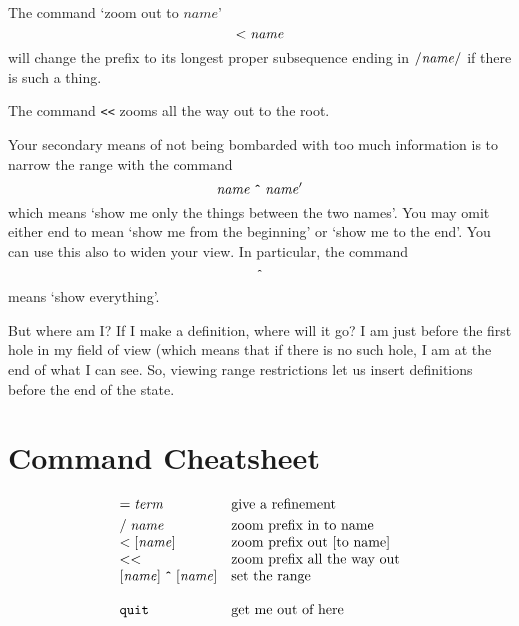 \documentclass{article}
\newcommand*\cleartoleftpage{%
  \clearpage
  \ifodd\value{page}\hbox{}\newpage\fi
}
\begin{document}
The command `zoom out to $\mathit{name}$'
\[
{\tt <}\;\mathit{name}
\]
will change the prefix to its longest proper subsequence ending in
${\tt /}\mathit{name}{\tt /}$
if there is such a thing.

The command {\tt <<} zooms all the way out to the root.

Your secondary means of not being bombarded with too much information is to narrow
the range with the command
\[
\mathit{name}\;\mbox{\tt \^{}}\;\mathit{name}'
\]
which means `show me only the things between the two names'. You may omit either end
to mean `show me from the beginning' or `show me to the end'. You can use this also to
widen your view. In particular, the command
\[
\mbox{\tt \^{}}
\]
means `show everything'.

But where am I? If I make a definition, where will it go? I am just before
the first hole in my field of view (which means that if there is no such hole, I am at the
end of what I can see. So, viewing range restrictions let us insert definitions
before the end of the state.



\cleartoleftpage
\appendix

\section{Command Cheatsheet}

\[\begin{array}{ll}
{\tt =}\;\mathit{term} & \mbox{give a refinement} \smallskip\\

{\tt /}\;\mathit{name} & \mbox{zoom prefix in to name}\\
{\tt <}\;[\mathit{name}] & \mbox{zoom prefix out [to name]}\\
{\tt <<} & \mbox{zoom prefix all the way out}\\
{}[\mathit{name}]\;\mbox{\tt \^{}}\;[\mathit{name}] & \mbox{set the
                                                      range}
\bigskip\\
{\tt quit} & \mbox{get me out of here}
\end{array}\]
\end{document}
